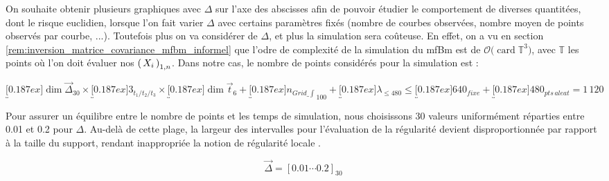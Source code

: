 
On souhaite obtenir plusieurs graphiques avec $\Delta$ sur l'axe des abscisses afin de pouvoir étudier le comportement de diverses quantitées, dont le risque euclidien, lorsque l'on fait varier $\Delta$ avec certains paramètres fixés (nombre de courbes observées, nombre moyen de points observés par courbe, ...). Toutefois plus on va considérer de $\Delta$, et plus la simulation sera coûteuse. En effet, on a vu en section \ref{rem:inversion_matrice_covariance_mfbm_informel} que l'odre de complexité de la simulation du mfBm est de $\mathcal O \bigl( \operatorname{card} \mathds T^3 \bigr)$, avec $\mathds T$ les points où l'on doit évaluer nos $\left( \, {X} _ {i} \, \right)_{1, n}$. Dans notre cas, le nombre de points considérés pour la simulation est :

\begin{equation*}
	\underbracket[0.187ex]{\dim \vec\Delta}_{30} \times \underbracket[0.187ex]{3}_{t_1 / t_2 / t_3} \times \underbracket[0.187ex]{\dim \vec t}_{6} + \underbracket[0.187ex]{n_{Grid\_\int}}_{100} + \underbracket[0.187ex]{\lambda}_{\leq 480} \leq \underbracket[0.187ex]{640}_{fixe} + \underbracket[0.187ex]{480}_{pts \, aleat} = 1 \, 120
\end{equation*}

Pour assurer un équilibre entre le nombre de points et les temps de simulation, nous choisissons 30 valeurs uniformément réparties entre 0.01 et 0.2 pour $\Delta$. Au-delà de cette plage, la largeur des intervalles pour l'évaluation de la régularité devient disproportionnée par rapport à la taille du support, rendant inappropriée la notion de \og régularité locale \fg.

\begin{equation*}
	\vec \Delta = \left[ 0.01 \cdots  0.2 \right]_{30}
\end{equation*}
